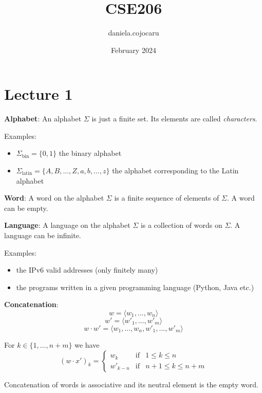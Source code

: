 \documentclass{article}
\title{CSE206}
\author{daniela.cojocaru }
\date{February 2024}
\newcommand{\defi}[2]{
    \begin{tcolorbox}[
        colback=red!50!yellow!10!white,
        colframe=red!50!yellow
    ]  \textbf{#1}: #2
    \end{tcolorbox}
}
\begin{document}
\maketitle

\section{Lecture 1}

\defi{Alphabet}{An alphabet $\Sigma$ is just a finite set. Its elements are called \textit{characters}.}

Examples:\begin{itemize}
    \item $\Sigma_{\text{bin}} = \{0,1\}$ the binary alphabet
    \item $\Sigma_{\text{latin}} = \{A, B,..., Z, a, b, ..., z\}$ the alphabet corresponding to the Latin alphabet
\end{itemize}

\defi{Word}{A word on the alphabet $\Sigma$ is a finite sequence of elements of $\Sigma$. A word can be empty.}

\defi{Language}{A language on the alphabet $\Sigma$ is a collection of words on $\Sigma$. A language can be infinite.}

Examples:\begin{itemize}
    \item the IPv6 valid addresses (only finitely many)
    \item the programs written in a given programming language (Python, Java etc.)
\end{itemize}

\defi{Concatenation}{$$w=\langle w_1,...,w_n\rangle$$ $$w'=\langle w'_1,...,w'_m\rangle$$ $$w\cdot w' = \langle w_1,...,w_n,w'_1,...,w'_m\rangle$$

For $k\in\{1,...,n+m\}$ we have 
$$(w\cdot x')_k=\left\{\begin{array}{ccc}
    w_k & \text{if} & 1\leq k\leq n \\
    w'_{k-n} & \text{if} & n+1\leq k\leq n+m 
\end{array}\right.$$

Concatenation of words is associative and its neutral element is the empty word.}
\end{document}
